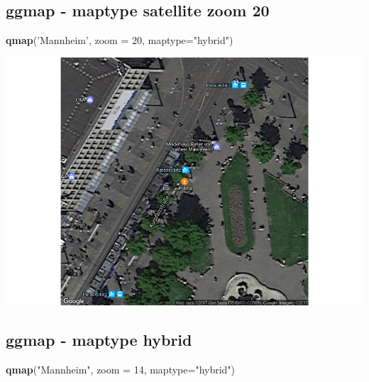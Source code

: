\documentclass[]{article}
\newenvironment{Shaded}{\begin{snugshade}}{\end{snugshade}}
\newcommand{\KeywordTok}[1]{\textcolor[rgb]{0.13,0.29,0.53}{\textbf{{#1}}}}
\newcommand{\DataTypeTok}[1]{\textcolor[rgb]{0.13,0.29,0.53}{{#1}}}
\newcommand{\DecValTok}[1]{\textcolor[rgb]{0.00,0.00,0.81}{{#1}}}
\newcommand{\StringTok}[1]{\textcolor[rgb]{0.31,0.60,0.02}{{#1}}}
\newcommand{\NormalTok}[1]{{#1}}
\begin{document}
\subsection{ggmap - maptype satellite zoom
20}\label{ggmap---maptype-satellite-zoom-20}

\begin{Shaded}
\begin{Highlighting}[]
\KeywordTok{qmap}\NormalTok{(}\StringTok{'Mannheim'}\NormalTok{, }\DataTypeTok{zoom =} \DecValTok{20}\NormalTok{, }\DataTypeTok{maptype=}\StringTok{"hybrid"}\NormalTok{)}
\end{Highlighting}
\end{Shaded}

\includegraphics{Intro_Datenanalyse1_files/figure-latex/unnamed-chunk-249-1.pdf}

\subsection{ggmap - maptype hybrid}\label{ggmap---maptype-hybrid}

\begin{Shaded}
\begin{Highlighting}[]
\KeywordTok{qmap}\NormalTok{(}\StringTok{"Mannheim"}\NormalTok{, }\DataTypeTok{zoom =} \DecValTok{14}\NormalTok{, }\DataTypeTok{maptype=}\StringTok{"hybrid"}\NormalTok{)}
\end{Highlighting}
\end{Shaded}
\end{document}
